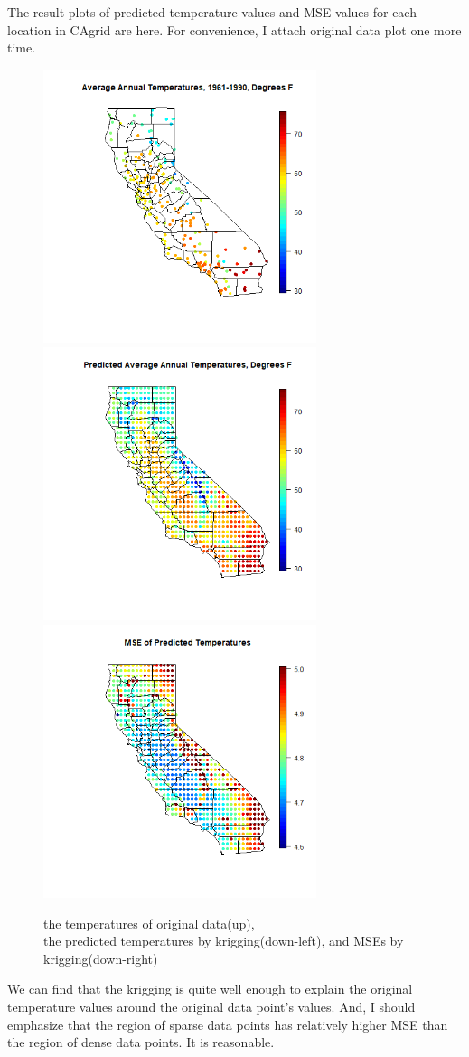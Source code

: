 \documentclass{article}
\begin{document}
\clearpage
The result plots of predicted temperature values and MSE values for each location in CAgrid are here.
For convenience, I attach original data plot one more time.

\begin{figure}[!h]
    \includegraphics[height=8cm]{prob2_CAtemp_avgtemp.png} \\
    \includegraphics[height=8cm]{prob2_CAgrid_predicted_mean.png}
    \includegraphics[height=8cm]{prob2_CAgrid_predicted_MSE.png}
    \caption{the temperatures of original data(up), 
    \\ the predicted temperatures by krigging(down-left), and MSEs by krigging(down-right)}
\end{figure}

We can find that the krigging is quite well enough to explain the original temperature values
around the original data point's values. 
And, I should emphasize that the region of sparse data points has relatively higher MSE
than the region of dense data points. It is reasonable.
\end{document}
